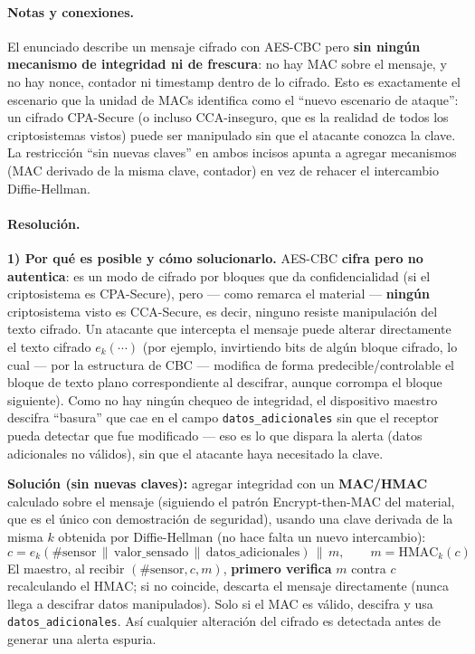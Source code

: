 \paragraph{Notas y conexiones.}
El enunciado describe un mensaje cifrado con AES-CBC pero \textbf{sin ningún mecanismo
de integridad ni de frescura}: no hay MAC sobre el mensaje, y no hay nonce, contador ni
timestamp dentro de lo cifrado. Esto es exactamente el escenario que la unidad de MACs
identifica como el ``nuevo escenario de ataque'': un cifrado CPA-Secure (o incluso
CCA-inseguro, que es la realidad de todos los criptosistemas vistos) puede ser
manipulado sin que el atacante conozca la clave. La restricción ``sin nuevas claves''
en ambos incisos apunta a agregar mecanismos (MAC derivado de la misma clave, contador)
en vez de rehacer el intercambio Diffie-Hellman.

\paragraph{Resolución.}

\textbf{1) Por qué es posible y cómo solucionarlo.}
AES-CBC \textbf{cifra pero no autentica}: es un modo de cifrado por bloques que da
confidencialidad (si el criptosistema es CPA-Secure), pero --- como remarca el
material --- \textbf{ningún} criptosistema visto es CCA-Secure, es decir, ninguno
resiste manipulación del texto cifrado. Un atacante que intercepta el mensaje puede
alterar directamente el texto cifrado $e_k(\cdots)$ (por ejemplo, invirtiendo bits de
algún bloque cifrado, lo cual --- por la estructura de CBC --- modifica de forma
predecible/controlable el bloque de texto plano correspondiente al descifrar, aunque
corrompa el bloque siguiente). Como no hay ningún chequeo de integridad, el dispositivo
maestro descifra ``basura'' que cae en el campo \texttt{datos\_adicionales} sin que el
receptor pueda detectar que fue modificado --- eso es lo que dispara la alerta (datos
adicionales no válidos), sin que el atacante haya necesitado la clave.

\textbf{Solución (sin nuevas claves):} agregar integridad con un \textbf{MAC/HMAC}
calculado sobre el mensaje (siguiendo el patrón Encrypt-then-MAC del material, que es el
único con demostración de seguridad), usando una clave derivada de la misma $k$ obtenida
por Diffie-Hellman (no hace falta un nuevo intercambio):
\begin{equation*}
c = e_k(\#\text{sensor}\,\|\,\text{valor\_sensado}\,\|\,\text{datos\_adicionales}) \,\|\, m,
\qquad m = \mathrm{HMAC}_k(c)
\end{equation*}
El maestro, al recibir $(\#\text{sensor}, c, m)$, \textbf{primero verifica} $m$ contra
$c$ recalculando el HMAC; si no coincide, descarta el mensaje directamente (nunca llega
a descifrar datos manipulados). Solo si el MAC es válido, descifra y usa
\texttt{datos\_adicionales}. Así cualquier alteración del cifrado es detectada antes de
generar una alerta espuria.

